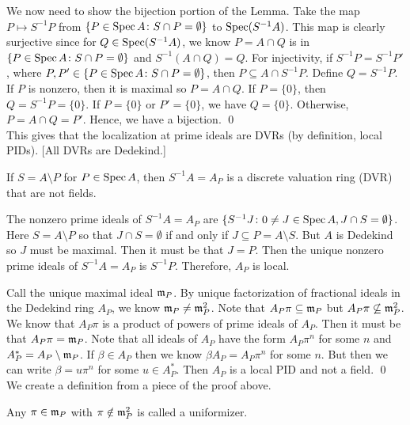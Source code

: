 We now need to show the bijection portion of the Lemma. Take the map $P \mapsto S^{-1}P$ from $\{P \in \operatorname{Spec} A \colon S \cap P =\emptyset\}$ to $\operatorname{Spec}(S^{-1}A)$. This map is clearly surjective since for $Q \in \operatorname{Spec}(S^{-1}A)$, we know $P= A \cap Q$ is in $\{P \in \operatorname{Spec} A \colon S \cap P =\emptyset\}$ and $S^{-1}(A \cap Q)=Q$. For injectivity, if $S^{-1}P=S^{-1}P'$, where $P,P' \in \{P \in \operatorname{Spec} A \colon S \cap P =\emptyset\}$, then $P \subseteq A \cap S^{-1}P$. Define $Q=S^{-1}P$. If $P$ is nonzero, then it is maximal so $P=A \cap Q$. If $P=\{0\}$, then $Q=S^{-1}P=\{0\}$. If $P=\{0\}$ or $P'=\{0\}$, we have $Q=\{0\}$. Otherwise, $P= A \cap Q=P'$. Hence, we have a bijection. \qed \\


This gives that the localization at prime ideals are DVRs (by definition, local PIDs). [All DVRs are Dedekind.] 	

\begin{cor}
If $S=A \setminus P$ for $P \in \operatorname{Spec} A$, then $S^{-1}A=A_P$ is a discrete valuation ring (DVR) that are not fields. 
\end{cor}	
	
\pf The nonzero prime ideals of $S^{-1}A=A_P$ are $\{S^{-1} J \colon 0 \neq J \in \operatorname{Spec} A, J \cap S = \emptyset\}$. Here $S=A \setminus P$ so that $J \cap S=\emptyset$ if and only if $J \subseteq P=A \setminus S$. But $A$ is Dedekind so $J$ must be maximal. Then it must be that $J=P$. Then the unique nonzero prime ideals of $S^{-1}A=A_P$ is $S^{-1}P$. Therefore, $A_P$ is local. 

Call the unique maximal ideal $\mathfrak{m}_P$. By unique factorization of fractional ideals in the Dedekind ring $A_P$, we know $\mathfrak{m}_P \neq \mathfrak{m}_P^2$. Note that $A_P \pi \subseteq \mathfrak{m}_P$ but $A_P \pi \not\subseteq \mathfrak{m}_P^2$. We know that $A_P\pi$ is a product of powers of prime ideals of $A_P$. Then it must be that $A_P\pi = \mathfrak{m}_P$. Note that all ideals of $A_P$ have the form $A_P\pi^n$ for some $n$ and $A_P^*=A_P \setminus \mathfrak{m}_P$. If $\beta \in A_P$ then we know $\beta A_P=A_P \pi^n$ for some $n$. But then we can write $\beta= u \pi^n$ for some $u \in A_P^*$. Then $A_P$ is a local PID and not a field. \qed \\


We create a definition from a piece of the proof above. 

\begin{dfn}[Uniformizer]
Any $\pi \in \mathfrak{m}_P$ with $\pi \notin \mathfrak{m}_P^2$ is called a uniformizer. 
\end{dfn} 
	
